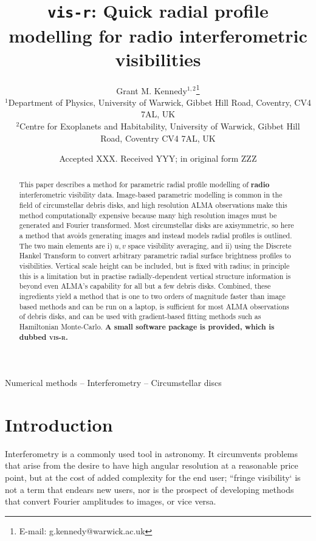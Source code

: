 \documentclass[fleqn,usenatbib]{mnras}
\title[vis-r]{\texttt{vis-r}: Quick radial profile modelling for radio interferometric visibilities}
\author[G. M. Kennedy]{
Grant M. Kennedy$^{1,2}$\thanks{E-mail: g.kennedy@warwick.ac.uk}
\\
$^{1}$Department of Physics, University of Warwick, Gibbet Hill Road, Coventry, CV4 7AL, UK\\
$^{2}$Centre for Exoplanets and Habitability, University of Warwick, Gibbet Hill Road, Coventry CV4 7AL, UK\\
}
\date{Accepted XXX. Received YYY; in original form ZZZ}
\begin{document}
\label{firstpage}
\pagerange{\pageref{firstpage}--\pageref{lastpage}}
\maketitle

\begin{abstract}
This paper describes a method for parametric radial profile modelling of \textbf{radio} interferometric visibility data. Image-based parametric modelling is common in the field of circumstellar debris disks, and high resolution ALMA observations make this method computationally expensive because many high resolution images must be generated and Fourier transformed. Most circumstellar disks are axisymmetric, so here a method that avoids generating images and instead models radial profiles is outlined. The two main elements are i) $u,v$ space visibility averaging, and ii) using the Discrete Hankel Transform to convert arbitrary parametric radial surface brightness profiles to visibilities. Vertical scale height can be included, but is fixed with radius; in principle this is a limitation but in practise radially-dependent vertical structure information is beyond even ALMA's capability for all but a few debris disks. Combined, these ingredients yield a method that is one to two orders of magnitude faster than image based methods and can be run on a laptop, is sufficient for most ALMA observations of debris disks, and can be used with gradient-based fitting methods such as Hamiltonian Monte-Carlo. \textbf{A small software package is provided, which is dubbed \textsc{vis-r}.}
\end{abstract}

\begin{keywords}
Numerical methods -- Interferometry -- Circumstellar discs
\end{keywords}



\section{Introduction}

Interferometry is a commonly used tool in astronomy. It circumvents problems that arise from the desire to have high angular resolution at a reasonable price point, but at the cost of added complexity for the end user; ``fringe visibility` is not a term that endears new users, nor is the prospect of developing methods that convert Fourier amplitudes to images, or vice versa.
\end{document}

